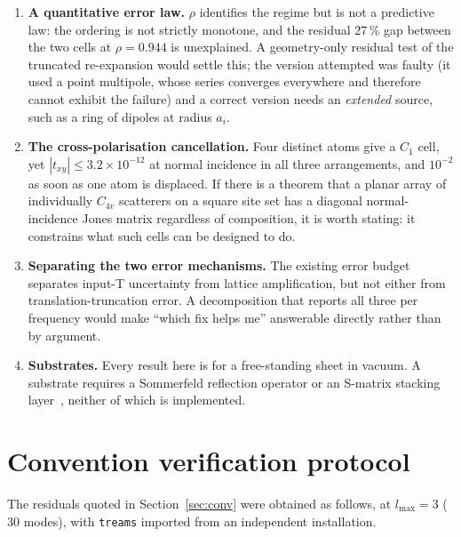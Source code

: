 \documentclass[11pt,a4paper]{article}
\newcommand{\lmax}{\ensuremath{l_{\max}}}
\theoremstyle{plain}
\theoremstyle{definition}
\begin{document}
\begin{enumerate}[leftmargin=*,itemsep=2pt]
\item \textbf{A quantitative error law.} $\rho$ identifies the regime but is not
      a predictive law: the ordering is not strictly monotone, and the residual
      $27\,\%$ gap between the two cells at $\rho = 0.944$ is unexplained. A
      geometry-only residual test of the truncated re-expansion would settle
      this; the version attempted was faulty (it used a point multipole, whose
      series converges everywhere and therefore cannot exhibit the failure) and a
      correct version needs an \emph{extended} source, such as a ring of dipoles
      at radius $a_i$.
\item \textbf{The cross-polarisation cancellation.} Four distinct atoms give a
      $C_1$ cell, yet $|t_{xy}| \le 3.2\times10^{-12}$ at normal incidence in all
      three arrangements, and $10^{-2}$ as soon as one atom is displaced. If
      there is a theorem that a planar array of individually $C_{4v}$ scatterers
      on a square site set has a diagonal normal-incidence Jones matrix
      regardless of composition, it is worth stating: it constrains what such
      cells can be designed to do.
\item \textbf{Separating the two error mechanisms.} The existing error budget
      separates input-T uncertainty from lattice amplification, but not either
      from translation-truncation error. A decomposition that reports all three
      per frequency would make ``which fix helps me'' answerable directly rather
      than by argument.
\item \textbf{Substrates.} Every result here is for a free-standing sheet in
      vacuum. A substrate requires a Sommerfeld reflection operator or an
      S-matrix stacking layer~\cite{egel2017,stefanou2000}, neither of which is
      implemented.
\end{enumerate}

\appendix

\section{Convention verification protocol}
\label{app:conv}

The residuals quoted in Section~\ref{sec:conv} were obtained as follows, at
$\lmax = 3$ ($30$ modes), with \texttt{treams} imported from an independent
installation.
\end{document}
